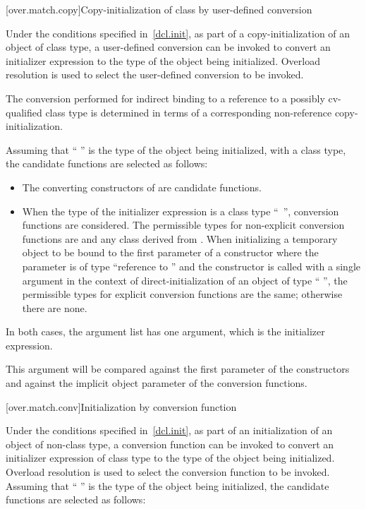 [over.match.copy]{Copy-initialization of class by user-defined conversion}%

\pnum
Under the conditions specified in~\ref{dcl.init}, as
part of a copy-initialization of an object of class type, a user-defined
conversion can be invoked to convert an initializer expression to the
type of the object being initialized.
Overload resolution is used
to select the user-defined conversion to be invoked.
\begin{note}
The conversion performed for indirect binding to a reference to a possibly
cv-qualified class type is determined in terms of a corresponding non-reference
copy-initialization.
\end{note}
Assuming that
`` '' is the type of the object being initialized, with
a class type,
the candidate functions are selected as follows:

\begin{itemize}
\item
The converting constructors of
are candidate functions.
\item
When the type of the initializer expression is a class type
``\cv{}~'',
conversion functions are considered.
The permissible types for non-explicit conversion functions are
 and any class derived from .
When initializing a temporary object
to be bound to the first parameter of a constructor
where the parameter is of type
``reference to  ''
and the constructor is
called with a single argument in the context of
direct-initialization of an object of type `` '',
the permissible types for explicit conversion functions are the same;
otherwise there are none.
\end{itemize}

\pnum
In both cases, the argument list has one argument, which is the initializer
expression.
\begin{note}
This argument will be compared against
the first parameter of the constructors and against the implicit
object parameter of the conversion functions.
\end{note}

[over.match.conv]{Initialization by conversion function}%

\pnum
Under the conditions specified in~\ref{dcl.init}, as
part of an initialization of an object of non-class type,
a conversion function can be invoked to convert an initializer
expression of class type to the type of the object
being initialized.
Overload resolution is used to select the
conversion function to be invoked.
Assuming that ``\cv{} '' is the
type of the object being initialized,
the candidate functions are selected as follows:

